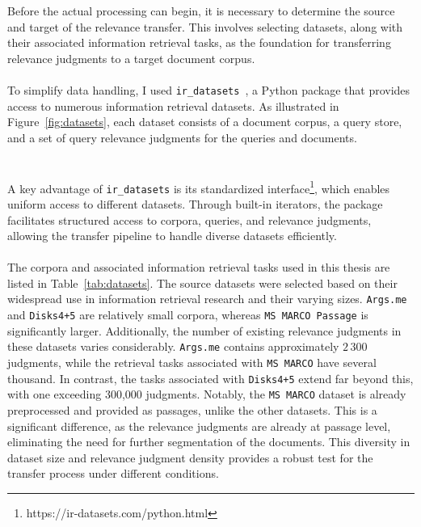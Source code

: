Before the actual processing can begin, it is necessary to determine the source and target of the relevance transfer. This involves selecting datasets, along with their associated information retrieval tasks, as the foundation for transferring relevance judgments to a target document corpus.
\\\\
To simplify data handling, I used \texttt{ir\_datasets}~\citep{macavaney:2021}, a Python package that provides access to numerous information retrieval datasets. As illustrated in Figure~\ref{fig:datasets}, each dataset consists of a document corpus, a query store, and a set of query relevance judgments for the queries and documents.
\\\\\\
A key advantage of \texttt{ir\_datasets} is its standardized interface\footnote{https://ir-datasets.com/python.html}, which enables uniform access to different datasets. Through built-in iterators, the package facilitates structured access to corpora, queries, and relevance judgments, allowing the transfer pipeline to handle diverse datasets efficiently.
\\\\
The corpora and associated information retrieval tasks used in this thesis are listed in Table~\ref{tab:datasets}. The source datasets were selected based on their widespread use in information retrieval research and their varying sizes. \texttt{Args.me} and \texttt{Disks4+5} are relatively small corpora, whereas \texttt{MS MARCO Passage} is significantly larger. Additionally, the number of existing relevance judgments in these datasets varies considerably. \texttt{Args.me} contains approximately $2\,300$ judgments, while the retrieval tasks associated with \texttt{MS MARCO} have several thousand. In contrast, the tasks associated with \texttt{Disks4+5} extend far beyond this, with one exceeding 300,000 judgments. Notably, the \texttt{MS MARCO} dataset is already preprocessed and provided as passages, unlike the other datasets. This is a significant difference, as the relevance judgments are already at passage level, eliminating the need for further segmentation of the documents. This diversity in dataset size and relevance judgment density provides a robust test for the transfer process under different conditions.

